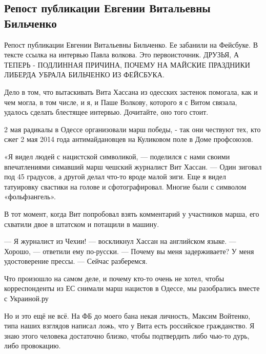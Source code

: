  
 
 
 
 
\subsection{Репост публикации Евгении Витальевны Бильченко}

Репост публикации Евгении Витальевны Бильченко. Ее забанили на Фейсбуке. В
тексте ссылка на интервью Павла волкова. Это первоисточник. ДРУЗЬЯ, А ТЕПЕРЬ -
ПОДЛИННАЯ ПРИЧИНА, ПОЧЕМУ НА МАЙСКИЕ ПРАЗДНИКИ ЛИБЕРДА УБРАЛА БИЛЬЧЕНКО ИЗ
ФЕЙСБУКА.

Дело в том, что вытаскивать Вита Хассана из одесских застенок помогала, как и
чем могла, в том числе, и я, и Паше Волкову, которого я с Витом связала,
удалось сделать блестящее интервью. Дочитайте, оно того стоит.

2 мая радикалы в Одессе организовали марш победы, - так они чествуют тех, кто
сжег 2 мая 2014 года антимайдановцев на Куликовом поле в Доме профсоюзов.

«Я видел людей с нацистской символикой, — поделился с нами своими впечатлениями
симавший марш чешский журналист Вит Хассан. — Один зиговал под 45 градусов, а
другой делал что-то вроде малой зиги. Еще я видел татуировку свастики на голове
и сфотографировал. Многие были с символом «фольфзангель».

В тот момент, когда Вит попробовал взять комментарий у участников марша, его схватили двое в штатском и потащили в машину.

— Я журналист из Чехии! — воскликнул Хассан на английском языке.
— Хорошо, — ответили ему по-русски.
— Почему вы меня задерживаете? У меня удостоверение прессы.
— Сейчас разберемся.

Что произошло на самом деле, и почему кто-то очень не хотел, чтобы
корреспонденты из ЕС снимали марш нацистов в Одессе, мы разобрались вместе с
Украиной.ру

Но и это ещё не всё. На ФБ до моего бана некая личность, Максим Войтенко, типа
наших взглядов написал ложь, что у Вита есть российское гражданство. Я знаю
этого человека достаточно близко, чтобы подтвердить либо чью-то дурь, либо
провокацию.

